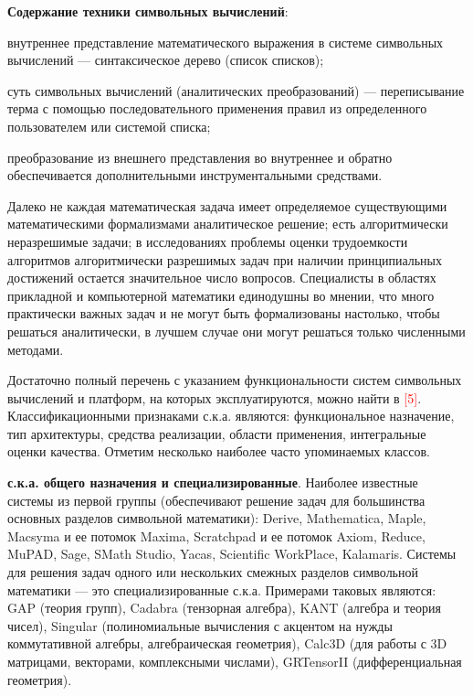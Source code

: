 \textbf{Содержание техники символьных вычислений}:
\begin{textitemize}
	\item внутреннее представление математического выражения в системе символьных вычислений --- синтаксическое дерево (список списков);
	\item суть символьных вычислений (аналитических преобразований) --- переписывание терма с помощью последовательного применения правил из определенного пользователем или системой списка;
	\item преобразование из внешнего представления во внутреннее и обратно обеспечивается дополнительными инструментальными средствами.
\end{textitemize}

Далеко не каждая математическая задача имеет определяемое существующими математическими формализмами аналитическое решение; есть алгоритмически неразрешимые задачи; в исследованиях проблемы оценки трудоемкости алгоритмов алгоритмически разрешимых задач при наличии принципиальных достижений остается значительное число вопросов. Специалисты в областях прикладной и компьютерной математики единодушны во мнении, что много практически важных задач и не могут быть формализованы настолько, чтобы решаться аналитически, в лучшем случае они могут решаться только численными методами.

Достаточно полный перечень с указанием функциональности систем символьных вычислений и платформ, на которых эксплуатируются, можно найти в \textcolor{red}{[5]}. Классификационными признаками с.к.а. являются: функциональное назначение, тип архитектуры, средства реализации, области применения, интегральные оценки качества. Отметим несколько наиболее часто упоминаемых классов.

\textbf{с.к.а. общего назначения и специализированные}. Наиболее известные системы из первой группы (обеспечивают решение задач для большинства основных разделов символьной математики): Derive, Mathematica, Maple, Macsyma и ее потомок Maxima, Scratchpad и ее потомок Axiom, Reduce, MuPAD, Sage, SMath Studio, Yacas, Scientific WorkPlace, Kalamaris. Системы для решения задач одного или нескольких смежных разделов символьной математики --- это специализированные с.к.а. Примерами таковых являются: GAP (теория групп), Cadabra (тензорная алгебра), KANT (алгебра и теория чисел), Singular (полиномиальные вычисления с акцентом на нужды коммутативной алгебры, алгебраическая геометрия), Calc3D (для работы с 3D матрицами, векторами, комплексными числами), GRTensorII (дифференциальная геометрия).

